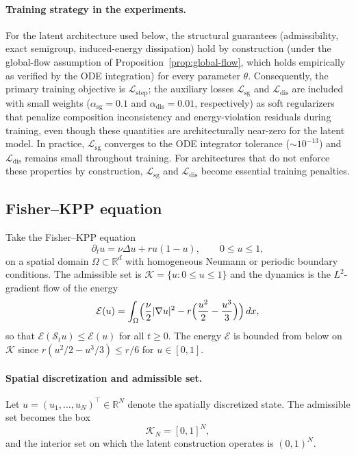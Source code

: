 \documentclass[11pt]{article}
\newcommand{\R}{\mathbb{R}}
\newcommand{\cS}{\mathcal{S}}
\newcommand{\cK}{\mathcal{K}}
\newcommand{\cE}{\mathcal{E}}
\begin{document}
\paragraph{Training strategy in the experiments.}
For the latent architecture used below, the structural guarantees (admissibility, exact semigroup, induced-energy dissipation) hold by construction (under the global-flow assumption of Proposition~\ref{prop:global-flow}, which holds empirically as verified by the ODE integration) for every parameter $\theta$. Consequently, the primary training objective is $\mathcal L_{\mathrm{step}}$; the auxiliary losses $\mathcal L_{\mathrm{sg}}$ and $\mathcal L_{\mathrm{dis}}$ are included with small weights ($\alpha_{\mathrm{sg}}=0.1$ and $\alpha_{\mathrm{dis}}=0.01$, respectively) as soft regularizers that penalize composition inconsistency and energy-violation residuals during training, even though these quantities are architecturally near-zero for the latent model. In practice, $\mathcal L_{\mathrm{sg}}$ converges to the ODE integrator tolerance ($\sim 10^{-13}$) and $\mathcal L_{\mathrm{dis}}$ remains small throughout training. For architectures that do not enforce these properties by construction, $\mathcal L_{\mathrm{sg}}$ and $\mathcal L_{\mathrm{dis}}$ become essential training penalties.

\subsection{Fisher--KPP equation}\label{subsec:fisher-kpp}
Take the Fisher--KPP equation
\begin{equation}\label{eq:fisher-kpp-bench}
\partial_t u = \nu \Delta u + r u(1-u), \qquad 0\le u\le 1,
\end{equation}
on a spatial domain $\Omega\subset\R^d$ with homogeneous Neumann or periodic boundary conditions. The admissible set is $\cK=\{u:0\le u\le 1\}$ and the dynamics is the $L^2$-gradient flow of the energy
\begin{equation}\label{eq:fisher-energy}
\cE(u)=\int_\Omega\Bigl(\frac{\nu}{2}|\nabla u|^2 - r\Bigl(\frac{u^2}{2}-\frac{u^3}{3}\Bigr)\Bigr)\,dx,
\end{equation}
so that $\cE(\cS_t u)\le\cE(u)$ for all $t\ge 0$. The energy $\cE$ is bounded from below on $\cK$ since $r(u^2/2-u^3/3)\le r/6$ for $u\in [0,1]$.

\paragraph{Spatial discretization and admissible set.}
Let $u=(u_1,\dots,u_N)^\top\in\R^N$ denote the spatially discretized state. The admissible set becomes the box
\begin{equation}\label{eq:KN-fisher}
\cK_N=[0,1]^N,
\end{equation}
and the interior set on which the latent construction operates is $(0,1)^N$.
\end{document}
